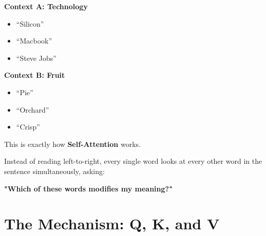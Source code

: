 \documentclass[11pt]{article}
\begin{document}
\begin{minipage}[t]{0.45\textwidth}
    {\large\color{brandblue}\textbf{Context A: Technology}}

    \begin{itemize}[leftmargin=*, itemsep=0.1in, label={\color{brandblue}\textbullet}]
        \item ``Silicon''
        \item ``Macbook''
        \item ``Steve Jobs''
    \end{itemize}

\end{minipage}
\hfill
\begin{minipage}[t]{0.45\textwidth}

    {\large\color{brandorange}\textbf{Context B: Fruit}}

    \begin{itemize}[leftmargin=*, itemsep=0.1in, label={\color{brandorange}\textbullet}]
        \item ``Pie''
        \item ``Orchard''
        \item ``Crisp''
    \end{itemize}

\end{minipage}

\vspace{0.3in}

\begin{infobox}

This is exactly how \textbf{Self-Attention} works. 

Instead of reading left-to-right, every single word looks at every other word in the sentence simultaneously, asking:

\begin{center}
\textbf{"Which of these words modifies my meaning?"}
\end{center}

\end{infobox}

\vfill
\newpage


\section*{The Mechanism: Q, K, and V}
\end{document}
